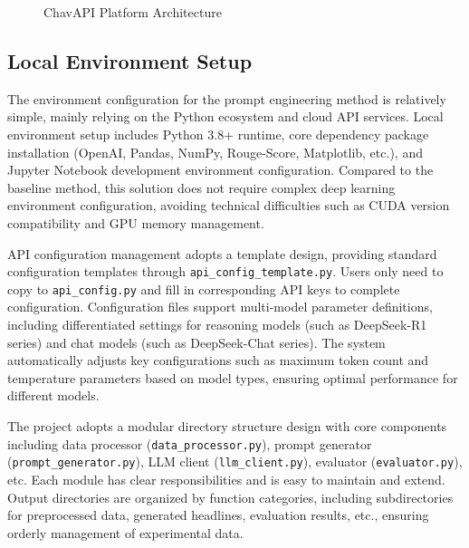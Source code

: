 \documentclass[10pt,a4paper]{article}
\begin{document}
\begin{figure}[H]
\caption{ChavAPI Platform Architecture}
\label{fig:chavapi_architecture}
\end{figure}

\subsection{Local Environment Setup}
The environment configuration for the prompt engineering method is relatively simple, mainly relying on the Python ecosystem and cloud API services. Local environment setup includes Python 3.8+ runtime, core dependency package installation (OpenAI, Pandas, NumPy, Rouge-Score, Matplotlib, etc.), and Jupyter Notebook development environment configuration. Compared to the baseline method, this solution does not require complex deep learning environment configuration, avoiding technical difficulties such as CUDA version compatibility and GPU memory management.

API configuration management adopts a template design, providing standard configuration templates through \texttt{api\_config\_template.py}. Users only need to copy to \texttt{api\_config.py} and fill in corresponding API keys to complete configuration. Configuration files support multi-model parameter definitions, including differentiated settings for reasoning models (such as DeepSeek-R1 series) and chat models (such as DeepSeek-Chat series). The system automatically adjusts key configurations such as maximum token count and temperature parameters based on model types, ensuring optimal performance for different models.

The project adopts a modular directory structure design with core components including data processor (\texttt{data\_processor.py}), prompt generator (\texttt{prompt\_generator.py}), LLM client (\texttt{llm\_client.py}), evaluator (\texttt{evaluator.py}), etc. Each module has clear responsibilities and is easy to maintain and extend. Output directories are organized by function categories, including subdirectories for preprocessed data, generated headlines, evaluation results, etc., ensuring orderly management of experimental data.
\end{document}
